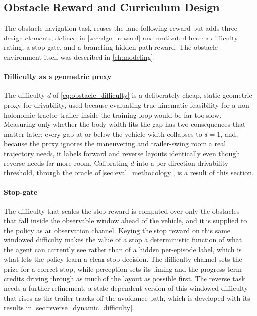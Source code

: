 \subsection{Obstacle Reward and Curriculum Design}
\label{sec:obstacle_reward}

The obstacle-navigation task reuses the lane-following reward but adds three design elements, defined in \cref{sec:algo_reward} and motivated here: a difficulty rating, a stop-gate, and a branching hidden-path reward. The obstacle environment itself was described in \cref{ch:modeling}.


\paragraph{Difficulty as a geometric proxy}
The difficulty $d$ of \cref{eq:obstacle_difficulty} is a deliberately cheap, static geometric proxy for drivability, used because evaluating true kinematic feasibility for a non-holonomic tractor-trailer inside the training loop would be far too slow. Measuring only whether the body width fits the gap has two consequences that matter later: every gap at or below the vehicle width collapses to $d=1$, and, because the proxy ignores the maneuvering and trailer-swing room a real trajectory needs, it labels forward and reverse layouts identically even though reverse needs far more room. Calibrating $d$ into a per-direction drivability threshold, through the oracle of \cref{sec:eval_methodology}, is a result of this section.

\paragraph{Stop-gate}
The difficulty that scales the stop reward is computed over only the obstacles that fall inside the observable window ahead of the vehicle, and it is supplied to the policy as an observation channel. Keying the stop reward on this same windowed difficulty makes the value of a stop a deterministic function of what the agent can currently see rather than of a hidden per-episode label, which is what lets the policy learn a clean stop decision. The difficulty channel sets the prize for a correct stop, while perception sets its timing and the progress term credits driving through as much of the layout as possible first. The reverse task needs a further refinement, a state-dependent version of this windowed difficulty that rises as the trailer tracks off the avoidance path, which is developed with its results in \cref{sec:reverse_dynamic_difficulty}.

